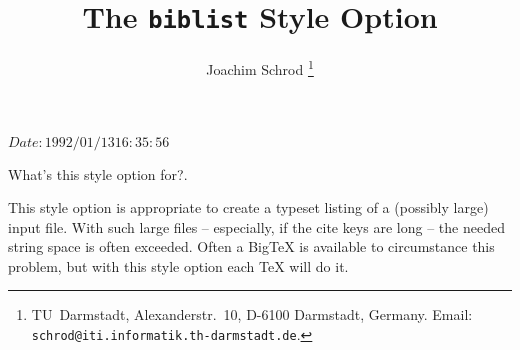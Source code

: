 
%
%


%
%
%
%
%






\pagestyle{plain}

\newdimen\examplewidth


\nofiles		%





\title{The {\tt biblist\/} Style Option}
\author{%
   Joachim Schrod%
   \thanks{%
      TU~Darmstadt, Alexanderstr.~10, D-6100 Darmstadt, Germany.\newline
      Email: {\tt schrod@iti.informatik.th-darmstadt.de}.%
      }%
   }
\RCSdate $Date: 1992/01/13 16:35:56 $

\maketitle



\chap What's this style option for?.

This style option is appropriate to create a typeset listing of a
(possibly large) \BibTeX{} input file. With such large files --
especially, if the cite keys are long -- the needed string space is
often exceeded. Often a Big\TeX{} is available to circumstance this
problem, but with this style option each \TeX{} will do it.

